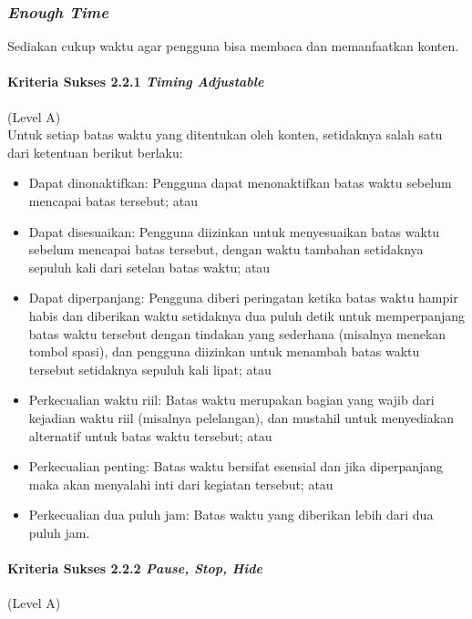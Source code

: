 \subsubsection{\textit{Enough Time}}
\label{sec:enough_time}
Sediakan cukup waktu agar pengguna bisa membaca dan memanfaatkan konten.

\paragraph{Kriteria Sukses 2.2.1 \textit{Timing Adjustable}}
\label{sec:kriteria_sukses_2.2.1}
(Level A)\\

Untuk setiap batas waktu yang ditentukan oleh konten, setidaknya salah satu dari ketentuan berikut berlaku:
\begin{itemize}
	\item Dapat dinonaktifkan: Pengguna dapat menonaktifkan batas waktu sebelum mencapai batas tersebut; atau
	\item Dapat disesuaikan: Pengguna diizinkan untuk menyesuaikan batas waktu sebelum mencapai batas tersebut, dengan waktu tambahan setidaknya sepuluh kali dari setelan batas waktu; atau
	\item Dapat diperpanjang: Pengguna diberi peringatan ketika batas waktu hampir habis dan diberikan waktu setidaknya dua puluh detik untuk memperpanjang batas waktu tersebut dengan tindakan yang sederhana (misalnya menekan tombol spasi), dan pengguna diizinkan untuk menambah batas waktu tersebut setidaknya sepuluh kali lipat; atau
	\item Perkecualian waktu riil: Batas waktu merupakan bagian yang wajib dari kejadian waktu riil (misalnya pelelangan), dan mustahil untuk menyediakan alternatif untuk batas waktu tersebut; atau
	\item Perkecualian penting: Batas waktu bersifat esensial dan jika diperpanjang maka akan menyalahi inti dari kegiatan tersebut; atau
	\item Perkecualian dua puluh jam: Batas waktu yang diberikan lebih dari dua puluh jam.
\end{itemize}

\paragraph{Kriteria Sukses 2.2.2 \textit{Pause, Stop, Hide}}
\label{sec:kriteria_sukses_2.2.2}
(Level A)\\

